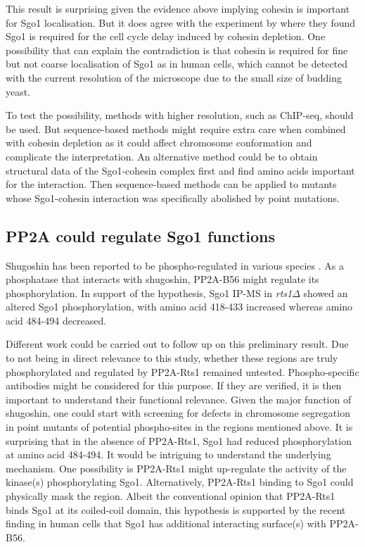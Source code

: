 This result is surprising given the evidence above implying cohesin is important for Sgo1 localisation. But it does agree with the experiment by \cite{Indjeian2005a} where they found Sgo1 is required for the cell cycle delay induced by cohesin depletion. One possibility that can explain the contradiction is that cohesin is required for fine but not coarse localisation of Sgo1 as in human cells, which cannot be detected with the current resolution of the microscope due to the small size of budding yeast. 

To test the possibility, methods with higher resolution, such as ChIP-seq, should be used. But sequence-based methods might require extra care when combined with cohesin depletion as it could affect chromosome conformation and complicate the interpretation. An alternative method could be to obtain structural data of the Sgo1-cohesin complex first and find amino acids important for the interaction. Then sequence-based methods can be applied to mutants whose Sgo1-cohesin interaction was specifically abolished by point mutations. 

\subsection{PP2A could regulate Sgo1 functions}

Shugoshin has been reported to be phospho-regulated in various species \citep{Llano2008Shugoshin-2Mice, Tanno2010, Rattani2013Sgol2Oocytes, Pouwels2007ShugoshinPlk1, Kawashima2007, Lee2014RegulationPhosphorylation, Liu2013, Liu2013a, Clarke2005, Resnick2006INCENPDrosophila, Nogueira2014, Yahya2020}. As a phosphatase that interacts with shugoshin, PP2A-B56 might regulate its phosphorylation. In support of the hypothesis, Sgo1 IP-MS in \textit{rts1$\Delta$} showed an altered Sgo1 phosphorylation, with amino acid 418-433 increased whereas amino acid 484-494 decreased. 

Different work could be carried out to follow up on this preliminary result. Due to not being in direct relevance to this study, whether these regions are truly phosphorylated and regulated by PP2A-Rts1 remained untested. Phospho-specific antibodies might be considered for this purpose. If they are verified, it is then important to understand their functional relevance. Given the major function of shugoshin, one could start with screening for defects in chromosome segregation in point mutants of potential phospho-sites in the regions mentioned above. It is surprising that in the absence of PP2A-Rts1, Sgo1 had reduced phosphorylation at amino acid 484-494. It would be intriguing to understand the underlying mechanism. One possibility is PP2A-Rts1 might up-regulate the activity of the kinase(s) phosphorylating Sgo1. Alternatively, PP2A-Rts1 binding to Sgo1 could physically mask the region. Albeit the conventional opinion that PP2A-Rts1 binds Sgo1 at its coiled-coil domain, this hypothesis is supported by the recent finding in human cells that Sgo1 has additional interacting surface(s) with PP2A-B56. 

